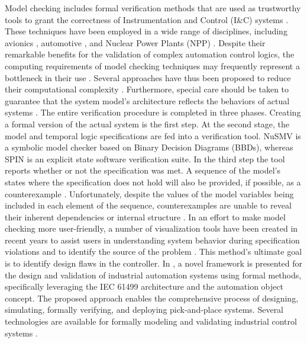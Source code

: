 \documentclass{ieeeojies}
\begin{document}
Model checking includes formal verification methods that are used as trustworthy tools to grant the correctness of Instrumentation and Control (I\&C) systems \cite{clarke1999, schneider2004, baier2008}.
These techniques have been employed in a wide range of disciplines, including avionics \cite{gelman2013, wang2019}, automotive \cite{todorov2018, kim2015, Filipovikj2016}, and Nuclear Power Plants (NPP) \cite{pakonen2021, Jee2010, nemeth2009, adiego2015}.
Despite their remarkable benefits for the validation of complex automation control logics, the computing requirements of model checking techniques may frequently represent a bottleneck in their use \cite{Buzhinsky2020}. Several approaches have thus been proposed to reduce their computational complexity \cite{Cimatti2012, Biere2003, burch1992}.
Furthermore, special care should be taken to guarantee that the system model's architecture reflects the behaviors of actual systems \cite{Cordeiro2020}. 
The entire verification procedure is completed in three phases. Creating a formal version of the actual system is the first step. At the second stage, the model and temporal logic specifications are fed into a verification tool.
NuSMV \cite{Cimatti2002} is a symbolic model checker based on  Binary Decision Diagrams (BBDs), whereas SPIN \cite{Holzmann1997} is an explicit state software verification suite.
In the third step the tool reports whether or not the specification was met. A sequence of the model's states where the specification does not hold will also be provided, if possible, as a counterexample \cite{beer2012}.
Unfortunately, despite the values of the model variables being included in each element of the sequence, counterexamples are unable to reveal their inherent dependencies or internal structure \cite{Ovsiannikova2021}.
In an effort to make model checking more user-friendly, a number of visualization tools \cite{pakonen2018} have been created in recent years to assist users in understanding system behavior during specification violations and to identify the source of the problem \cite{Loer2006, bochot2010, Patil2015}. This method's ultimate goal is to identify design flaws in the controller. 
In \cite{vyatkin2011iec}, a novel framework is presented for the design and validation of industrial automation systems using formal methods, specifically leveraging the IEC 61499 architecture and the automation object concept. The proposed approach enables the comprehensive process of designing, simulating, formally verifying, and deploying pick-and-place systems. 
Several technologies are available for formally modeling and validating industrial control systems \cite{vyatkin2001formal}.
\end{document}
